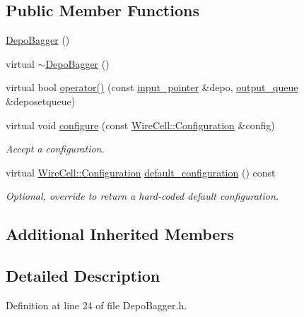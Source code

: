 \subsection*{Public Member Functions}
\begin{DoxyCompactItemize}
\item 
\hyperlink{class_wire_cell_1_1_gen_1_1_depo_bagger_af7f20c094caad047afc697d2df81e26c}{Depo\+Bagger} ()
\item 
virtual \hyperlink{class_wire_cell_1_1_gen_1_1_depo_bagger_a6130eeff3a9c849741d20130335c4398}{$\sim$\+Depo\+Bagger} ()
\item 
virtual bool \hyperlink{class_wire_cell_1_1_gen_1_1_depo_bagger_a1f79cacac114d24c939926147c6d9e2e}{operator()} (const \hyperlink{class_wire_cell_1_1_i_queuedout_node_acf5f716a764553f3c7055a9cf67e906e}{input\+\_\+pointer} \&depo, \hyperlink{class_wire_cell_1_1_i_queuedout_node_a39018e4e3dd886befac9636ac791a685}{output\+\_\+queue} \&deposetqueue)
\item 
virtual void \hyperlink{class_wire_cell_1_1_gen_1_1_depo_bagger_a2f151bd8fc7ecdf7d915668e59fa1714}{configure} (const \hyperlink{namespace_wire_cell_a9f705541fc1d46c608b3d32c182333ee}{Wire\+Cell\+::\+Configuration} \&config)
\begin{DoxyCompactList}\small\item\em Accept a configuration. \end{DoxyCompactList}\item 
virtual \hyperlink{namespace_wire_cell_a9f705541fc1d46c608b3d32c182333ee}{Wire\+Cell\+::\+Configuration} \hyperlink{class_wire_cell_1_1_gen_1_1_depo_bagger_ac00c7933215666449e5b364f2f8c5957}{default\+\_\+configuration} () const
\begin{DoxyCompactList}\small\item\em Optional, override to return a hard-\/coded default configuration. \end{DoxyCompactList}\end{DoxyCompactItemize}
\subsection*{Additional Inherited Members}


\subsection{Detailed Description}


Definition at line 24 of file Depo\+Bagger.\+h.



